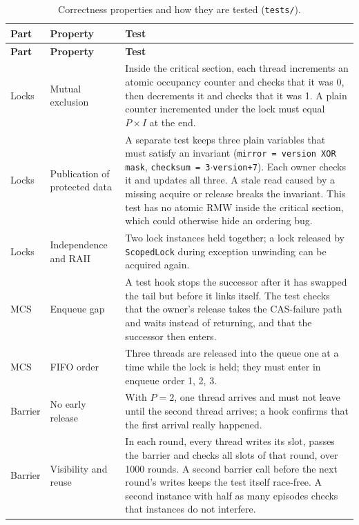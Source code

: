{\small
\begin{longtable}{|>{\raggedright\arraybackslash}p{}|>{\raggedright\arraybackslash}p{}|>{\raggedright\arraybackslash}p{}|}
\caption{Correctness properties and how they are tested (\texttt{tests/}).}\label{tab:test-props} \\
\hline
\textbf{Part} & \textbf{Property} & \textbf{Test} \\ \hline
\endfirsthead
\hline
\textbf{Part} & \textbf{Property} & \textbf{Test} \\ \hline
\endhead
Locks & Mutual exclusion & Inside the critical section, each thread increments an atomic occupancy counter and checks that it was 0, then decrements it and checks that it was 1. A plain counter incremented under the lock must equal $P\times I$ at the end. \\ \hline
Locks & Publication of protected data & A separate test keeps three plain variables that must satisfy an invariant (\texttt{mirror = version XOR mask}, \texttt{checksum = 3$\cdot$version+7}). Each owner checks it and updates all three. A stale read caused by a missing acquire or release breaks the invariant. This test has no atomic RMW inside the critical section, which could otherwise hide an ordering bug. \\ \hline
Locks & Independence and RAII & Two lock instances held together; a lock released by \texttt{ScopedLock} during exception unwinding can be acquired again. \\ \hline
MCS & Enqueue gap & A test hook stops the successor after it has swapped the tail but before it links itself. The test checks that the owner's release takes the CAS-failure path and waits instead of returning, and that the successor then enters. \\ \hline
MCS & FIFO order & Three threads are released into the queue one at a time while the lock is held; they must enter in enqueue order 1, 2, 3. \\ \hline
Barrier & No early release & With $P=2$, one thread arrives and must not leave until the second thread arrives; a hook confirms that the first arrival really happened. \\ \hline
Barrier & Visibility and reuse & In each round, every thread writes its slot, passes the barrier and checks all slots of that round, over 1000 rounds. A second barrier call before the next round's writes keeps the test itself race-free. A second instance with half as many episodes checks that instances do not interfere. \\ \hline

\end{longtable}}
